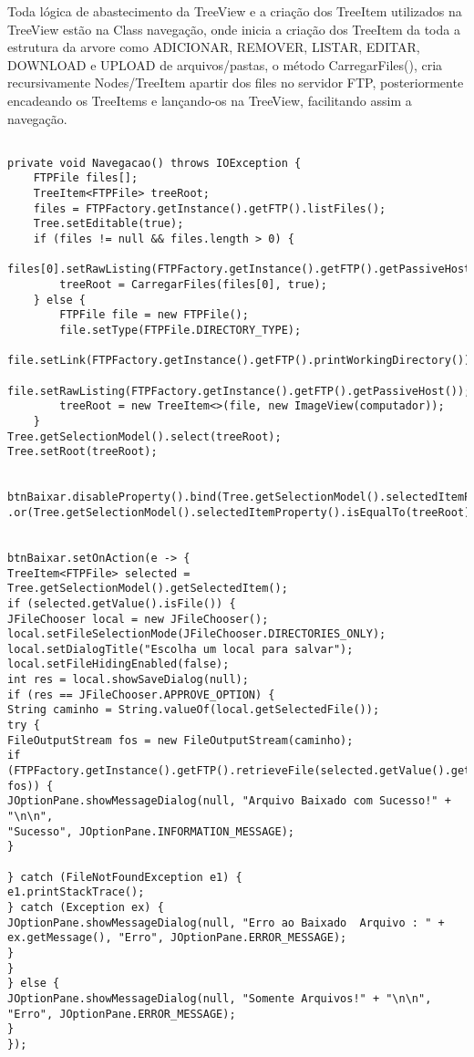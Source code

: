 \documentclass[12pt]{article}
\begin{document}
Toda lógica de abastecimento da TreeView e a criação dos TreeItem utilizados na TreeView estão na Class  navegação, onde inicia a criação dos TreeItem da toda a estrutura da arvore como ADICIONAR, REMOVER, LISTAR, EDITAR, DOWNLOAD e UPLOAD de arquivos/pastas, o método CarregarFiles(), cria recursivamente Nodes/TreeItem apartir dos files no servidor FTP, posteriormente encadeando os TreeItems e lançando-os na TreeView, facilitando assim a navegação.

\begin{lstlisting}

private void Navegacao() throws IOException {
	FTPFile files[];
	TreeItem<FTPFile> treeRoot;
	files = FTPFactory.getInstance().getFTP().listFiles();
	Tree.setEditable(true);
	if (files != null && files.length > 0) {
		files[0].setRawListing(FTPFactory.getInstance().getFTP().getPassiveHost());
		treeRoot = CarregarFiles(files[0], true);
	} else {
		FTPFile file = new FTPFile();
		file.setType(FTPFile.DIRECTORY_TYPE);
		file.setLink(FTPFactory.getInstance().getFTP().printWorkingDirectory());
		file.setRawListing(FTPFactory.getInstance().getFTP().getPassiveHost());
		treeRoot = new TreeItem<>(file, new ImageView(computador));
	}
Tree.getSelectionModel().select(treeRoot);
Tree.setRoot(treeRoot);


btnBaixar.disableProperty().bind(Tree.getSelectionModel().selectedItemProperty().isNull()
.or(Tree.getSelectionModel().selectedItemProperty().isEqualTo(treeRoot)));


btnBaixar.setOnAction(e -> {
TreeItem<FTPFile> selected = Tree.getSelectionModel().getSelectedItem();
if (selected.getValue().isFile()) {
JFileChooser local = new JFileChooser();
local.setFileSelectionMode(JFileChooser.DIRECTORIES_ONLY);
local.setDialogTitle("Escolha um local para salvar");
local.setFileHidingEnabled(false);
int res = local.showSaveDialog(null);
if (res == JFileChooser.APPROVE_OPTION) {
String caminho = String.valueOf(local.getSelectedFile());
try {
FileOutputStream fos = new FileOutputStream(caminho);
if (FTPFactory.getInstance().getFTP().retrieveFile(selected.getValue().getLink(), fos)) {
JOptionPane.showMessageDialog(null, "Arquivo Baixado com Sucesso!" + "\n\n",
"Sucesso", JOptionPane.INFORMATION_MESSAGE);
}

} catch (FileNotFoundException e1) {
e1.printStackTrace();
} catch (Exception ex) {
JOptionPane.showMessageDialog(null, "Erro ao Baixado  Arquivo : " + ex.getMessage(), "Erro", JOptionPane.ERROR_MESSAGE);
}
}
} else {
JOptionPane.showMessageDialog(null, "Somente Arquivos!" + "\n\n",
"Erro", JOptionPane.ERROR_MESSAGE);
}
});



\end{lstlisting}
\end{document}
